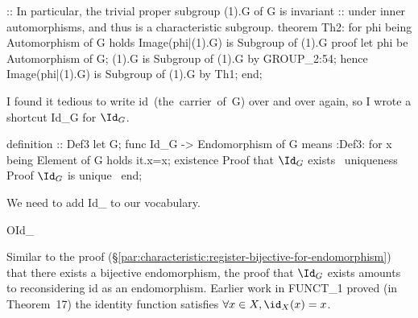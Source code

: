 \nwenddocs{}\endmoddef\nwstartdeflinemarkup{}\nwenddeflinemarkup
:: In particular, the trivial proper subgroup (1).G of G is invariant
:: under inner automorphisms, and thus is a characteristic subgroup.
theorem Th2:
  for phi being Automorphism of G
  holds Image(phi|(1).G) is Subgroup of (1).G
proof
  let phi be Automorphism of G;
  (1).G is Subgroup of (1).G by GROUP_2:54;
  hence Image(phi|(1).G) is Subgroup of (1).G by Th1;
end;

\nwendcode{}\nwdocspar

I found it tedious to write {\Tt{}id\ (the\ carrier\ of\ G)\nwendquote} over and over
again, so I wrote a shortcut {\Tt{}Id{\_}G\nwendquote} for $\Id_{G}$.

\nwenddocs{}\endmoddef\nwstartdeflinemarkup{}\nwenddeflinemarkup
definition :: Def3
  let G;
  func Id_G -> Endomorphism of G means
  :Def3:
  for x being Element of G holds it.x=x;
  existence
  \LA{}Proof that $\Id_{G}$ exists~{\nwtagstyle{}}\RA{}
  uniqueness
  \LA{}Proof $\Id_{G}$ is unique~{\nwtagstyle{}}\RA{}
end;

\nwendcode{}\nwdocspar

\M We need to add {\Tt{}Id{\_}\nwendquote} to our vocabulary.

\nwenddocs{}\endmoddef\nwstartdeflinemarkup{}\nwenddeflinemarkup
OId_

\nwendcode{}\nwdocspar

Similar to the proof (\S\ref{par:characteristic:register-bijective-for-endomorphism})
that there exists a bijective endomorphism, the proof that $\Id_{G}$
exists amounts to reconsidering {\Tt{}id\nwendquote} as an endomorphism. Earlier work
in {\Tt{}FUNCT{\_}1\nwendquote} proved (in Theorem~17) the identity function satisfies
$\forall x\in X, \id_{X}(x)=x$.

